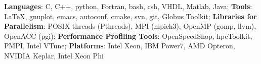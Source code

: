 {{\bf Languages}: C, C++, python, Fortran, bash, csh, VHDL, Matlab,
Java}; {{\bf Tools}: LaTeX, gnuplot, emacs, autoconf, cmake, svn, git,
Globus Toolkit}; {{\bf Libraries for Parallelism}: POSIX threads
(Pthreads), MPI (mpich3), OpenMP (gomp, llvm), OpenACC (pgi)}; {{\bf
Performance Profiling Tools}: OpenSpeedShop, hpcToolkit, PMPI, Intel
VTune}; {{\bf Platforms}: {Intel Xeon, IBM Power7, AMD Opteron, NVIDIA
Keplar, Intel Xeon Phi}}


